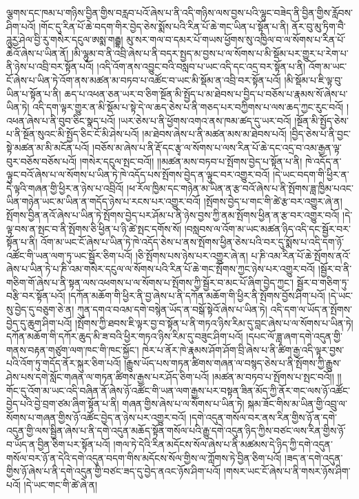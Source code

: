 ལྕགས་དང་ཁམ་པ་གཉིས་བྱིན་གྱིས་བརླབ་པའོ་ཞེས་པ་ནི་འདི་གཉིས་ལས་བྱས་པའི་ལྷུང་བཟེད་ནི་བྱིན་གྱིས་རློབས་ཤིག་པའོ། །གོང་དུ་རིན་པོ་ཆེ་བདག་གིར་བྱེད་ཅེས་སྨོས་པའི་རིན་པོ་ཆེ་གང་ཡིན་པ་སྟོན་པ་ནི། ནོར་བུ་མུ་ཏིག་བཻ་ཌཱུརྱ་ཤེལ་བྱི་རུ་གསེར་དངུལ་ཨསྨ་གརྦྷ། མུ་སར་གལ་བ་དམར་པོ་གཡས་ཕྱོགས་སུ་འཁྱིལ་བ་ལ་སོགས་པ་རིན་པོ་ཆེའོ་ཞེས་པ་ཡིན་ནོ། །མི་ལྷུམ་བ་ནི་འབྲི་ཞེས་པ་ནི་བདར་སྤྱད་མ་བྱས་པ་ལ་སོགས་པ་མི་སྡོམ་པར་གྱུར་པ་རེག་པ་ནི་ཉེས་པ་འབྲི་བར་སྟོན་པའོ། །འདི་འོག་ནས་འབྱུང་བའི་བསླབ་པ་ཡང་འདི་དང་འདྲ་བར་སྟོན་པ་ནི། འོག་མ་ཡང་ངོ་ཞེས་པ་ཡིན་ཏེ་འོག་ནས་མཚན་མ་བཏབ་པ་འཚོང་བ་ཡང་མི་སྡོམ་ན་འབྲི་བར་སྟོན་པའོ། །མི་སྡོམ་པ་ཇི་ལྟ་བུ་ཡིན་པ་སྟོན་པ་ནི། ཆད་པ་འཕན་ཅན་ཡར་བ་ཅིག་སྔོན་མི་སྤྱོད་པ་མ་ཐེབས་པ་བྱིད་པ་བཅོས་པ་རྣམས་སོ་ཞེས་པ་ཡིན་ཏེ། འདི་དག་ལྟར་གྱུར་ན་མི་སྡོམ་པ་སྟེ་དེ་ལ་ཆད་ཅེས་པ་ནི་གཅད་པར་བཀྱིགས་པ་ལས་ཆད་ཀྱང་རུང་བའོ། །འཕན་ཞེས་པ་ནི་བུབ་ཅིང་སྣད་པའོ། །ཡར་ཅེས་པ་ནི་ཕྱོགས་འགའ་ནས་ཁམ་ཚད་དུ་ཡར་བའོ། །སྔོན་མི་སྤྱོད་ཅེས་པ་ནི་སྔོན་སུའང་མི་སྤྱོད་ཅིང་ངོ་མི་ཤེས་པའོ། །མ་ཐེབས་ཞེས་པ་ནི་མཚན་མས་མ་ཐེབས་པའོ། །བྱིད་ཅེས་པ་ནི་བྱང་སྟེ་མཚན་མ་མི་མངོན་པའོ། །བཅོས་མ་ཞེས་པ་ནི་རྡོ་དང་རྩྭ་ལ་སོགས་པ་ལས་རིན་པོ་ཆེ་དང་འདྲ་བ་འམ་རྒྱན་ལྟ་བུར་བཅོས་བཅོས་པའོ། །གསེར་དངུལ་སྤང་བའོ།། །།མཚན་མས་བཏབ་པ་སྤོགས་བྱེད་པ་སྟོན་པ་ནི། ཁེ་འདོད་ན་ལྟུང་བའོ་ཞེས་པ་ལ་སོགས་པ་ཡིན་ཏེ་ཁེ་འདོད་པས་སྤོགས་བྱེད་ན་ལྟུང་བར་འགྱུར་བའོ། །དེ་ཡང་བདག་གི་ཕྱིར་ན་དེ་ལྟའི་གཞན་གྱི་ཕྱིར་ན་ཉེས་པ་འབྲིའོ། །ཕ་རོལ་ཁྱིམ་དང་གཉེན་མ་ཡིན་ན་རྩ་བའོ་ཞེས་པ་ནི་སྤོགས་ཟླ་ཁྱིམ་པའང་ཡིན་གཉེན་ཡང་མ་ཡིན་ན་གདོད་ཉེས་པ་རངས་པར་འགྱུར་བའོ། །སྤོགས་བྱེད་པ་གང་གི་ཚེ་རྩ་བར་འགྱུར་ཞེ་ན། སྤོགས་བྱིན་ནའོ་ཞེས་པ་ཡིན་ཏེ་སྤོགས་བྱེད་པར་ཤོམ་པ་ནི་ཉེས་བྱས་ཀྱི་ནམ་སྤོགས་ཕྱིན་ན་རྩ་བར་འགྱུར་བའོ། །དེ་ལྟ་བས་ན་སྤང་བ་ནི་སྤོགས་ཅི་ཕྱིན་པ་ཉི་ཚེ་སྤང་དགོས་སོ། །བསླབས་ལ་འོག་མ་ཡང་མཚན་ཉིད་འདི་དང་སྦྱོར་བར་སྟོན་པ་ནི། འོག་མ་ཡང་ངོ་ཞེས་པ་ཡིན་ཏེ་ཁེ་འདོད་ཅེས་པ་ནས་སྤོགས་ཕྱིན་ཅེས་པའི་བར་དུ་སྨོས་པ་འདི་དག་ཉོ་འཚོང་གི་ཡན་ལག་ཏུ་ཡང་སྦྱོར་ཅིག་པའོ། །ཅི་སྤོགས་པས་ཉེས་པར་འགྱུར་ཞེ་ན། པ་ཎི་འམ་རིན་པོ་ཆེ་སྤོགས་ནའོ་ཞེས་པ་ཡིན་ཏེ་པ་ཎི་འམ་གསེར་དངུལ་ལ་སོགས་པའི་རིན་པོ་ཆེ་གང་སྤོགས་ཀྱང་ཉེས་པར་འགྱུར་བའོ། །སྦྱོར་བ་ནི་གཅིག་གོ་ཞེས་པ་ནི་སྟན་ལས་འཕགས་པ་ལ་སོགས་པ་སྤོགས་ཀྱི་སྦྱོར་བ་མང་པོ་ཞིག་བྱེད་ཀྱང་། སྦྱོར་བ་གཅིག་ཏུ་བརྩི་བར་སྟོན་པའོ། །དཀོན་མཆོག་གི་ཕྱིར་ནི་བྱ་ཞེས་པ་ནི་དཀོན་མཆོག་གི་ཕྱིར་ནི་སྤོགས་བྱོས་ཤིག་པའོ། །དེ་ཡང་སུ་བྱེད་དུ་བཅུག་ཅེ་ན། ཀུན་དགའ་བའམ་དགེ་བསྙེན་ཡོད་ན་བསྒོ་སྟེའོ་ཞེས་པ་ཡིན་ཏེ། འདི་དག་ལ་ཡོད་ན་སྤོགས་བྱེད་དུ་ཆུག་ཤིག་པའོ། །སྤོགས་ཀྱི་ཐབས་ཇི་ལྟར་བྱ་བ་སྟོན་པ་ནི་གཏའ་ཉིས་རིམ་དུ་བླང་ཞེས་པ་ལ་སོགས་པ་ཡིན་ཏེ། དཀོན་མཆོག་གི་དཀོར་ཆུད་མི་ཟ་བའི་ཕྱིར་གཏའ་ཉིས་རིམ་དུ་བཟུང་ཤིག་པའོ། །དཔང་ལོ་ཟླ་ཞག་དགེ་འདུན་གྱི་གནས་བརྟན་གཙུག་ལག་ཁང་གི་ཁང་སྐྱོང་། ཁེར་པ་ནོར་ཁེ་རྣམས་ཤོག་ཤོག་བྲི་ཞེས་པ་ནི་ཚིག་རྒྱ་འདི་ལྟར་བྱས་པའི་འོག་ཏུ་གདོད་ནོར་སྐུར་ཅིག་པའོ། །རྒྱུས་ཡོད་པས་གཏན་ཚིགས་གཞན་ལ་བསྙད་ཅེས་པ་ནི་སྤོགས་ཀྱི་རྒྱུས་ཤེས་པས་དགེ་སློང་གཞན་ལ་གཏན་ཚིགས་རྒྱས་པར་ཤོད་ཅིག་པའོ། །མཚན་མ་བཏབ་པ་སྤོགས་པ་སྤང་བའོ།། །།གོང་དུ་འོག་མ་ཡང་འདི་བཞིན་ནོ་ཞེས་ཉོ་འཚོང་གི་ཡན་ལག་རྒྱས་པར་བསྟན་ཟིན་མོད་ཀྱི་ནོར་གང་ལས་ཉོ་འཚོང་བྱེད་པའི་བྱེ་བྲག་ཙམ་ཞིག་སྟོན་པ་ནི། གཞན་གྱིས་ཞེས་པ་ལ་སོགས་པ་ཡིན་ཏེ། སྐམ་ཟོང་གིས་མ་ཡིན་གྱི་འབྲུ་ལ་སོགས་པ་གཞན་གྱིས་ཉོ་འཚོང་བྱེད་ན་ཉེས་པར་འགྱུར་བའོ། །དགེ་འདུན་གསོལ་བར་ནས་རིན་གྱིས་ཉོ་ན་དགེ་འདུན་གྱི་ལས་སྦྱིན་ཞེས་པ་ནི་དགེ་འདུན་མཆོད་སྟོན་གསོལ་པའི་རྒྱུ་དགེ་འདུན་ཉིད་ཀྱིས་བཙང་ལས་རིན་གྱིས་ཉོ་བ་ཡོད་ན་བྱིན་ཅིག་པར་སྟོན་པའོ། །གལ་ཏེ་དེའི་རིན་མདོངས་སོལ་ཞེས་པ་ནི་མཚམས་དེ་ཉིད་ཀྱི་དགེ་འདུན་གསོལ་བར་ཉོ་ན་དེའི་དགེ་འདུན་བདག་གིས་མདོངས་སོལ་གྱིས་ལ་ཀློགས་ཏེ་བྱིན་ཅིག་པའོ། །ཟད་ན་དགེ་འདུན་གྱིས་ཉོ་ཞེས་པ་ནི་དགེ་འདུན་གྱི་བཙང་ཟད་དུ་བྱེད་ནའང་ཉོས་ཤིག་པའོ། །གསར་ཡང་ངོ་ཞེས་པ་ནི་གསར་ཉོས་ཤིག་པའོ། །དེ་ཡང་གང་གི་ཚེ་ཞེ་ན། 